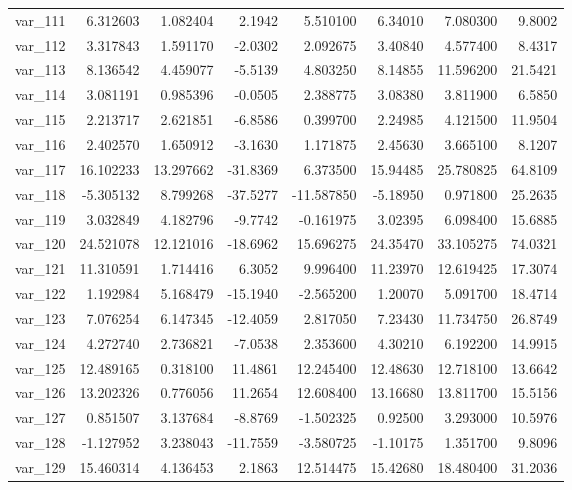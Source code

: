 \documentclass[12pt]{article}
\begin{document}
\begin{longtable}{lrrrrrrr}
 var\_111 &   6.312603 &   1.082404 &   2.1942 &   5.510100 &   6.34010 &   7.080300 &   9.8002 \\
 var\_112 &   3.317843 &   1.591170 &  -2.0302 &   2.092675 &   3.40840 &   4.577400 &   8.4317 \\
 var\_113 &   8.136542 &   4.459077 &  -5.5139 &   4.803250 &   8.14855 &  11.596200 &  21.5421 \\
 var\_114 &   3.081191 &   0.985396 &  -0.0505 &   2.388775 &   3.08380 &   3.811900 &   6.5850 \\
 var\_115 &   2.213717 &   2.621851 &  -6.8586 &   0.399700 &   2.24985 &   4.121500 &  11.9504 \\
 var\_116 &   2.402570 &   1.650912 &  -3.1630 &   1.171875 &   2.45630 &   3.665100 &   8.1207 \\
 var\_117 &  16.102233 &  13.297662 & -31.8369 &   6.373500 &  15.94485 &  25.780825 &  64.8109 \\
 var\_118 &  -5.305132 &   8.799268 & -37.5277 & -11.587850 &  -5.18950 &   0.971800 &  25.2635 \\
 var\_119 &   3.032849 &   4.182796 &  -9.7742 &  -0.161975 &   3.02395 &   6.098400 &  15.6885 \\
 var\_120 &  24.521078 &  12.121016 & -18.6962 &  15.696275 &  24.35470 &  33.105275 &  74.0321 \\
 var\_121 &  11.310591 &   1.714416 &   6.3052 &   9.996400 &  11.23970 &  12.619425 &  17.3074 \\
 var\_122 &   1.192984 &   5.168479 & -15.1940 &  -2.565200 &   1.20070 &   5.091700 &  18.4714 \\
 var\_123 &   7.076254 &   6.147345 & -12.4059 &   2.817050 &   7.23430 &  11.734750 &  26.8749 \\
 var\_124 &   4.272740 &   2.736821 &  -7.0538 &   2.353600 &   4.30210 &   6.192200 &  14.9915 \\
 var\_125 &  12.489165 &   0.318100 &  11.4861 &  12.245400 &  12.48630 &  12.718100 &  13.6642 \\
 var\_126 &  13.202326 &   0.776056 &  11.2654 &  12.608400 &  13.16680 &  13.811700 &  15.5156 \\
 var\_127 &   0.851507 &   3.137684 &  -8.8769 &  -1.502325 &   0.92500 &   3.293000 &  10.5976 \\
 var\_128 &  -1.127952 &   3.238043 & -11.7559 &  -3.580725 &  -1.10175 &   1.351700 &   9.8096 \\
 var\_129 &  15.460314 &   4.136453 &   2.1863 &  12.514475 &  15.42680 &  18.480400 &  31.2036 \\

\end{longtable}
\end{document}
